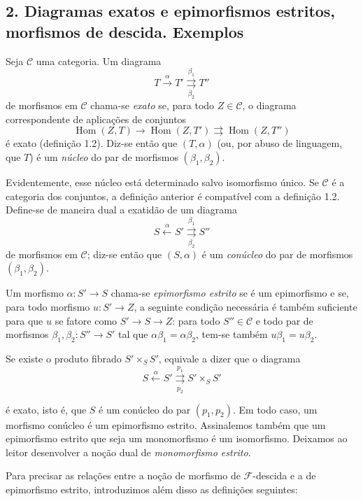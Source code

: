 \subsection*{2. Diagramas exatos e epimorfismos estritos, morfismos de
descida. Exemplos}

 Seja $\mathcal C$ uma categoria. Um diagrama
\[
  T\xrightarrow{\alpha}T'
  \overset{\beta_1}{\underset{\beta_2}{\rightrightarrows}}T''
\]
de morfismos em $\mathcal C$ chama-se \emph{exato} se, para todo
$Z\in\mathcal C$, o diagrama correspondente de aplicações de conjuntos
\[
  \operatorname{Hom}(Z,T)\longrightarrow
  \operatorname{Hom}(Z,T')
  \rightrightarrows\operatorname{Hom}(Z,T'')
\]
é exato (definição 1.2). Diz-se então que $(T,\alpha)$ (ou, por abuso de
linguagem, que $T$) é um \emph{núcleo} do par de morfismos
$(\beta_1,\beta_2)$.

Evidentemente, esse núcleo está determinado salvo isomorfismo único. Se
$\mathcal C$ é a categoria dos conjuntos, a definição anterior é
compatível com a definição 1.2. Define-se de maneira dual a exatidão de um
diagrama
\[
  S\xleftarrow{\alpha}S'
  \overset{\beta_1}{\underset{\beta_2}{\rightrightarrows}}S''
\]
de morfismos em $\mathcal C$; diz-se então que $(S,\alpha)$ é um
\emph{conúcleo} do par de morfismos $(\beta_1,\beta_2)$.

 Um morfismo $\alpha:S'\longrightarrow S$ chama-se
\emph{epimorfismo estrito} se é um epimorfismo e se, para todo morfismo
$u:S'\longrightarrow Z$, a seguinte condição necessária é também
suficiente para que $u$ se fatore como
$S'\longrightarrow S\longrightarrow Z$: para todo $S''\in\mathcal C$ e todo
par de morfismos $\beta_1,\beta_2:S''\longrightarrow S'$ tal que
$\alpha\beta_1=\alpha\beta_2$, tem-se também $u\beta_1=u\beta_2$.

Se existe o produto fibrado $S'\times_S S'$, equivale a dizer que o diagrama
\[
  S\xleftarrow{\alpha}S'
  \overset{p_1}{\underset{p_2}{\rightrightarrows}}S'\times_S S'
\]

é exato, isto é, que $S$ é um conúcleo do par $(p_1,p_2)$. Em todo
caso, um morfismo conúcleo é um epimorfismo estrito. Assinalemos também que um
epimorfismo estrito que seja um monomorfismo é um isomorfismo. Deixamos ao
leitor desenvolver a noção dual de \emph{monomorfismo estrito}.

Para precisar as relações entre a noção de morfismo de
$\mathcal F$-descida e a de epimorfismo estrito, introduzimos além disso as
definições seguintes:

